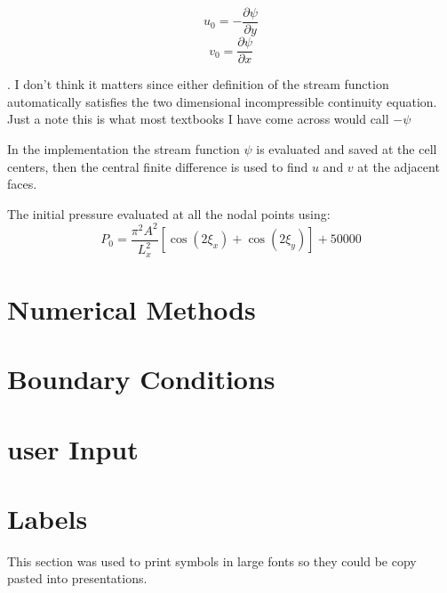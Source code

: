 \documentclass{article}
\begin{document}
$$ u_0 = -\frac{\partial \psi}{\partial y} $$
$$ v_0 = \frac{\partial \psi}{\partial x} $$

{. I don't think it matters since either definition of the stream function automatically satisfies the two dimensional incompressible continuity equation. Just a note this is what most textbooks I have come across would call $-\psi$}

In the implementation the stream function $\psi$ is evaluated and saved at the cell centers, then the central finite difference is used to find $u$ and $v$ at the adjacent faces.


The initial pressure evaluated at all the nodal points using:
$$ P_0 =  \frac{\pi^2 A^2}{L_x^2} \left[ \cos(2 \xi_x) + \cos(2 \xi_y) \right] + 50000 $$




\section{Numerical Methods}

\section{Boundary Conditions}

\section{user Input}



\section{Labels}
This section was used to print symbols in large fonts so they could be copy pasted into presentations.
\end{document}
